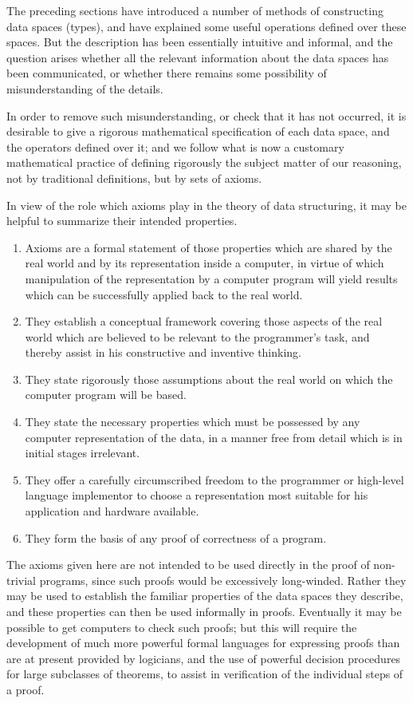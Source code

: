 \documentclass[twoside,11pt]{book}
\begin{document}
The preceding sections have introduced a number of methods of constructing data spaces (types), and have explained some useful operations defined over these spaces. But the description has been essentially intuitive and informal, and the question arises whether all the relevant information about the data spaces has been communicated, or whether there remains some possibility of misunderstanding of the details.

In order to remove such misunderstanding, or check that it has not occurred, it is desirable to give a rigorous mathematical specification of each data space, and the operators defined over it; and we follow what is now a customary mathematical practice of defining rigorously the subject matter of our reasoning, not by traditional definitions, but by sets of axioms.

In view of the role which axioms play in the theory of data structuring, it may be helpful to summarize their intended properties.

\begin{enumerate}[wide, nosep, label=(\arabic*)]
	\item Axioms are a formal statement of those properties which are shared by the real world and by its representation inside a computer, in virtue of which manipulation of the representation by a computer program will yield results which can be successfully applied back to the real world.
	\item They establish a conceptual framework covering those aspects of the real world which are believed to be relevant to the programmer's task, and thereby assist in his constructive and inventive thinking.
	\item They state rigorously those assumptions about the real world on which the computer program will be based.
	\item They state the necessary properties which must be possessed by any computer representation of the data, in a manner free from detail which is in initial stages irrelevant.
	\item They offer a carefully circumscribed freedom to the programmer or high-level language implementor to choose a representation most suitable for his application and hardware available.
	\item They form the basis of any proof of correctness of a program.
\end{enumerate}

The axioms given here are not intended to be used directly in the proof of non-trivial programs, since such proofs would be excessively long-winded. Rather they may be used to establish the familiar properties of the data spaces they describe, and these properties can then be used informally in proofs. Eventually it may be possible to get computers to check such proofs; but this will require the development of much more powerful formal languages for expressing proofs than are at present provided by logicians, and the use of powerful decision procedures for large subclasses of theorems, to assist in verification of the individual steps of a proof.
\end{document}
